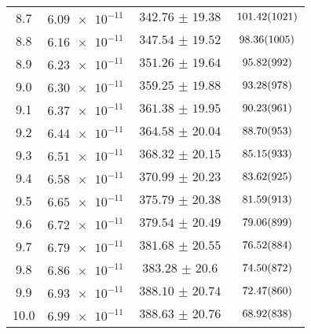 \begin{table}
\begin{tabular}{c c c c}
    8.7 &  $\SI{6.09e-11}{}$  & $\SI{342.76(1938)}{}$   &   $\SI{101.42 (1021)}{}$   \\    
    8.8 &  $\SI{6.16e-11}{}$  & $\SI{347.54(1952)}{}$   &   $\SI{98.36 (1005)}{}$   \\    
    8.9 &  $\SI{6.23e-11}{}$  & $\SI{351.26(1964)}{}$   &   $\SI{95.82( 992)}{}$  \\    
    9.0 &  $\SI{6.30e-11}{}$  & $\SI{359.25(1988)}{}$   &   $\SI{93.28( 978)}{}$   \\    
    9.1 &  $\SI{6.37e-11}{}$  & $\SI{361.38(1995)}{}$   &   $\SI{90.23( 961)}{}$   \\    
    9.2 &  $\SI{6.44e-11}{}$  & $\SI{364.58(2004)}{}$   &   $\SI{88.70( 953)}{}$   \\    
    9.3 &  $\SI{6.51e-11}{}$  & $\SI{368.32(2015)}{}$   &   $\SI{85.15( 933)}{}$   \\    
    9.4 &  $\SI{6.58e-11}{}$  & $\SI{370.99(2023)}{}$   &   $\SI{83.62( 925)}{}$   \\    
    9.5 &  $\SI{6.65e-11}{}$  & $\SI{375.79(2038)}{}$   &   $\SI{81.59( 913)}{}$   \\    
    9.6 &  $\SI{6.72e-11}{}$  & $\SI{379.54(2049)}{}$   &   $\SI{79.06( 899)}{}$   \\    
    9.7 &  $\SI{6.79e-11}{}$  & $\SI{381.68(2055)}{}$   &   $\SI{76.52( 884)}{}$   \\    
    9.8 &  $\SI{6.86e-11}{}$  & $\SI{383.28(2060)}{}$   &   $\SI{74.50( 872)}{}$   \\    
    9.9 &  $\SI{6.93e-11}{}$  & $\SI{388.10(2074)}{}$   &   $\SI{72.47( 860)}{}$   \\    
    10.0&  $\SI{6.99e-11}{}$  & $\SI{388.63(2076)}{}$   &   $\SI{68.92( 838)}{}$\\
    \bottomrule
\end{tabular}
\end{table}

